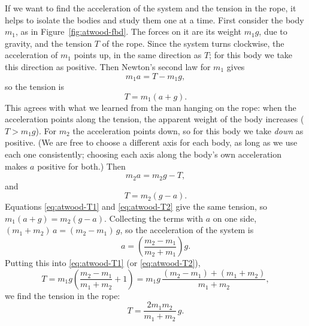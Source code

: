 \documentclass[11pt,a4paper]{article}
\begin{document}
If we want to find the acceleration of the system and the tension in the rope, it helps to isolate
the bodies and study them one at a time. First consider the body $m_1$, as in
Figure~\ref{fig:atwood-fbd}. The forces on it are its weight $m_1 g$, due to gravity, and the tension
$T$ of the rope. Since the system turns clockwise, the acceleration of $m_1$ points up, in the same
direction as $T$; for this body we take this direction as positive. Then Newton's second law for $m_1$
gives
\begin{equation}\label{eq:atwood-1}
  m_1 a = T - m_1 g ,
\end{equation}
so the tension is
\begin{equation}\label{eq:atwood-T1}
  T = m_1 (a + g) .
\end{equation}
This agrees with what we learned from the man hanging on the rope: when the acceleration points
along the tension, the apparent weight of the body increases ($T > m_1 g$). For $m_2$ the
acceleration points down, so for this body we take \emph{down} as positive. (We are free to choose a
different axis for each body, as long as we use each one consistently; choosing each axis along the
body's own acceleration makes $a$ positive for both.) Then
\begin{equation}\label{eq:atwood-2}
  m_2 a = m_2 g - T ,
\end{equation}
and
\begin{equation}\label{eq:atwood-T2}
  T = m_2 (g - a) .
\end{equation}
Equations \eqref{eq:atwood-T1} and \eqref{eq:atwood-T2} give the same tension, so
$m_1(a + g) = m_2(g - a)$. Collecting the terms with $a$ on one side,
$(m_1 + m_2)\,a = (m_2 - m_1)\,g$, so the acceleration of the system is
\begin{equation}\label{eq:atwood-a}
  a = \left(\frac{m_2 - m_1}{m_2 + m_1}\right) g .
\end{equation}
Putting this into \eqref{eq:atwood-T1} (or \eqref{eq:atwood-T2}),
\[
  T = m_1 g\left(\frac{m_2 - m_1}{m_1 + m_2} + 1\right) = m_1 g\,\frac{(m_2 - m_1) + (m_1 + m_2)}{m_1 + m_2} ,
\]
we find the tension in the rope:
\begin{equation}\label{eq:atwood-T}
  T = \frac{2 m_1 m_2}{m_1 + m_2}\, g .
\end{equation}
\end{document}
